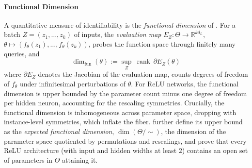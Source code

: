 \documentclass[mathematics,review,submit,moreauthors]{Definitions/mdpi}
\begin{document}
\paragraph{Functional Dimension}
A quantitative measure of identifiability is the \emph{functional dimension} of \citet{elisendagrigsby2025aim}.
For a batch $Z=(z_1,\dots,z_k)$ of inputs, the \emph{evaluation map} $E_Z:\Theta\to\mathbb{R}^{kd_L}$, $\theta\mapsto(f_\theta(z_1),\dots,f_\theta(z_k))$, probes the function space through finitely many queries, and
\begin{equation*}
    \dim_{\mathrm{fun}}(\theta):=\sup_{Z}\ \operatorname{rank}\,\partial E_Z(\theta)
\end{equation*}
where $\partial E_Z$ denotes the Jacobian of the evaluation map, counts degrees of freedom of $f_\theta$ under infinitesimal perturbations of $\theta$.
For ReLU networks, the functional dimension is upper bounded by the parameter count minus one degree of freedom per hidden neuron, accounting for the rescaling symmetries.
Crucially, the functional dimension is inhomogeneous across parameter space, dropping with instance-level symmetries, which inflate the fiber.
\citet{grillo2026} further define its upper bound as the \emph{expected functional dimension}, $\dim(\Theta/\!\sim)$, the dimension of the parameter space quotiented by permutations and rescalings, and prove that every ReLU architecture (with input and hidden widths at least $2$) contains an open set of parameters in $\Theta$ attaining it.
\end{document}
